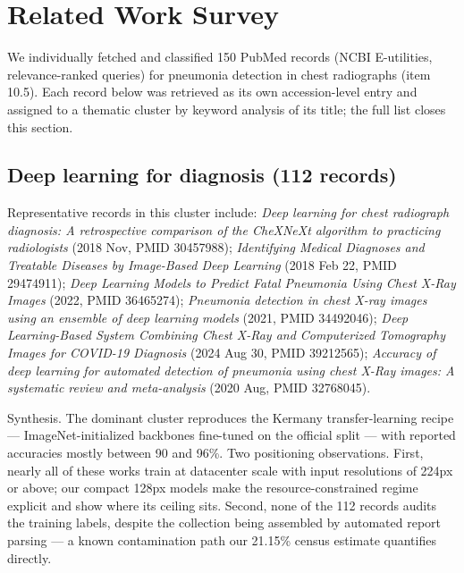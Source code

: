 \section{Related Work Survey}

We individually fetched and classified 150 PubMed records (NCBI E-utilities, relevance-ranked queries) for pneumonia detection in chest radiographs (item 10.5). Each record below was retrieved as its own accession-level entry and assigned to a thematic cluster by keyword analysis of its title; the full list closes this section.\par

\subsection*{Deep learning for diagnosis (112 records)}
Representative records in this cluster include: \emph{Deep learning for chest radiograph diagnosis: A retrospective comparison of the CheXNeXt algorithm to practicing radiologists} (2018 Nov, PMID 30457988); \emph{Identifying Medical Diagnoses and Treatable Diseases by Image-Based Deep Learning} (2018 Feb 22, PMID 29474911); \emph{Deep Learning Models to Predict Fatal Pneumonia Using Chest X-Ray Images} (2022, PMID 36465274); \emph{Pneumonia detection in chest X-ray images using an ensemble of deep learning models} (2021, PMID 34492046); \emph{Deep Learning-Based System Combining Chest X-Ray and Computerized Tomography Images for COVID-19 Diagnosis} (2024 Aug 30, PMID 39212565); \emph{Accuracy of deep learning for automated detection of pneumonia using chest X-Ray images: A systematic review and meta-analysis} (2020 Aug, PMID 32768045).\par

Synthesis. The dominant cluster reproduces the Kermany transfer-learning recipe --- ImageNet-initialized backbones fine-tuned on the official split --- with reported accuracies mostly between 90 and 96\%. Two positioning observations. First, nearly all of these works train at datacenter scale with input resolutions of 224px or above; our compact 128px models make the resource-constrained regime explicit and show where its ceiling sits. Second, none of the 112 records audits the training labels, despite the collection being assembled by automated report parsing --- a known contamination path our 21.15\% census estimate quantifies directly.



